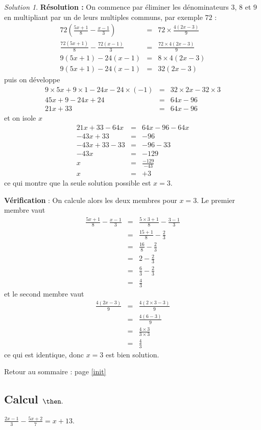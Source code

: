 \documentclass[14pt]{article}
\theoremstyle{remark}
\newtheorem*{sol}{Solution}
\newcounter{n}
\renewcommand{\it}{Retour au sommaire : page \ref{init}
	\subsection{Calcul $ \mathbf{ \then}.$}\label{\then} \stepcounter{n} }
\theoremstyle{plain}
\begin{document}
\begin{sol}
\textbf{Résolution :} On commence par éliminer les dénominateurs $3$, $8$ et $9$ en multipliant par un de leurs multiples communs, par exemple $72$ : 
\begin{eqnarray*}
72\left(\frac{5x+1}8-\frac{x-1}3 \right)&=&
72\times \frac{4(2x-3)}9\\
\frac{72(5x+1)}8 - \frac{72(x-1)}3 &=& 
\frac{72\times4(2x-3)}9 \\
9(5x+1)-24(x-1) &=& 8\times4(2x-3)\\
9(5x+1)-24(x-1)&=& 32(2x-3)
\end{eqnarray*} puis on développe
\begin{eqnarray*} 
9\times 5x+9\times 1-24x-24\times(-1)&=& 32\times 2x-32\times 3\\
45x+9-24x+24&=& 64x-96\\
21x+33&=& 64x-96
\end{eqnarray*}et on isole $x$
\begin{eqnarray*}
21x+33-64x&=& 64x-96-64x\\
-43x+33 &=& -96 \\
-43x+33-33&=&-96-33\\
-43x &=& -129 \\
x &=& \frac{-129}{-43}\\
x&=& +3
\end{eqnarray*}
ce qui montre que la seule solution possible est $x=3$. 

\textbf{Vérification} : On calcule alors les deux membres pour $x=3$. Le premier membre vaut 
\begin{eqnarray*}\frac{5x+1}8-\frac{x-1}3 &=&
\frac{5\times3+1}8-\frac{3-1}3\\
&=&\frac{15+1}8-\frac23\\
&=& \frac{16}8-\frac23\\
&=& 2-\frac23\\
&=& \frac63-\frac23\\
&=& \frac43
\end{eqnarray*}
et le second membre vaut 
\begin{eqnarray*}\frac{4(2x-3)}9&=&
\frac{4(2\times3-3)}9 \\
&=&\frac{4(6-3)}9\\
&=& \frac{4\times3}{3\times3}\\
&=&\frac43
\end{eqnarray*} ce qui est identique, donc $x=3$ est bien solution.
\end{sol}
\it $\frac{2x-1}3 - \frac{5x+2}7 = x +13$. 
\end{document}
